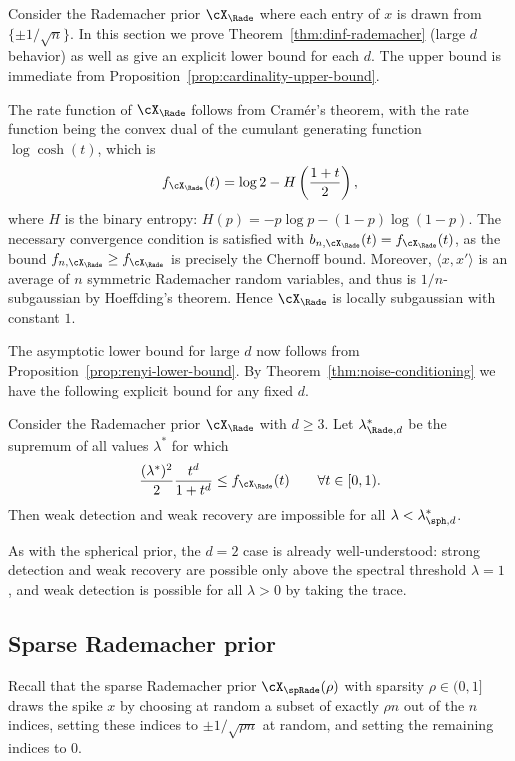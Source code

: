 \documentclass{article}
\begin{document}
Consider the Rademacher prior $\cX_\Rade$ where each entry of $x$ is drawn \iid from $\{\pm 1/\sqrt{n}\}$. In this section we prove Theorem~\ref{thm:dinf-rademacher} (large $d$ behavior) as well as give an explicit lower bound for each $d$. The upper bound is immediate from Proposition~\ref{prop:cardinality-upper-bound}.

The rate function of $\cX_\Rade$ follows from Cram\'er's theorem, with the rate function being the convex dual of the cumulant generating function $\log\cosh(t)$, which is
$$ f_{\cX_\Rade}(t) = \log 2 - H\left(\frac{1+t}{2}\right), $$
where $H$ is the binary entropy: $H(p) = - p\log p -(1-p)\log(1-p)$. The necessary convergence condition is satisfied with $b_{n,\cX_\Rade}(t) = f_{\cX_\Rade}(t)$, as the bound $f_{n,\cX_\Rade} \geq f_{\cX_\Rade}$ is precisely the Chernoff bound. Moreover, $\langle x,x' \rangle$ is an average of $n$ \iid symmetric Rademacher random variables, and thus is $1/n$-subgaussian by Hoeffding's theorem. Hence $\cX_\Rade$ is locally subgaussian with constant $1$.

The asymptotic lower bound for large $d$ now follows from Proposition~\ref{prop:renyi-lower-bound}. By Theorem~\ref{thm:noise-conditioning} we have the following explicit bound for any fixed $d$.

\begin{theorem}
\label{thm:rad-lower}
Consider the Rademacher prior $\cX_\Rade$ with $d\ge 3$. Let $\lambda^*_{\Rade,d}$ be the supremum of all values $\lambda^*$ for which
$$\frac{(\lambda^*)^2}{2}\frac{t^d}{1+t^d} \leq f_{\cX_\Rade}(t) \qquad \forall t \in [0,1).$$
Then weak detection and weak recovery are impossible for all $\lambda < \lambda^*_{\sph,d}$.
\end{theorem}
\noindent As with the spherical prior, the $d=2$ case is already well-understood: strong detection and weak recovery are possible only above the spectral threshold $\lambda = 1$ \cite{dam,pwbm}, and weak detection is possible for all $\lambda > 0$ by taking the trace.







\subsection{Sparse Rademacher prior}
\label{sec:sparse-rad}

Recall that the sparse Rademacher prior $\cX_\spRade(\rho)$ with sparsity $\rho \in (0,1]$ draws the spike $x$ by choosing at random a subset of exactly $\rho n$ out of the $n$ indices, setting these indices to $\pm 1/\sqrt{\rho n}$ at random, and setting the remaining indices to 0.
\end{document}
